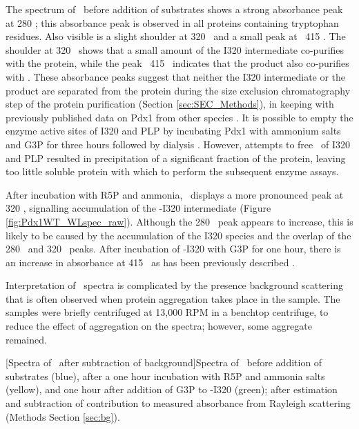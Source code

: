 The spectrum of \atpdx ~before addition of substrates shows a strong absorbance peak at 280 \nm ; this absorbance peak is observed in all proteins containing tryptophan residues. Also visible is a slight shoulder at 320 \nm ~and a small peak at ~415 \nm . The shoulder at 320 \nm ~shows that a small amount of the I320 intermediate co-purifies with the protein, while the peak ~415 \nm ~indicates that the product also co-purifies with \atpdx . These absorbance peaks suggest that neither the I320 intermediate or the product are separated from the protein during the size exclusion chromatography step of the protein purification (Section \ref{sec:SEC_Methods}), in keeping with previously published data on Pdx1 from other species \cite{Raschle2007}. It is possible to empty the enzyme active sites of I320 and PLP by incubating Pdx1 with ammonium salts and G3P for three hours followed by dialysis \cite{Raschle2007}. However, attempts to free \atpdx ~of I320 and PLP resulted in precipitation of a significant fraction of the protein, leaving too little soluble protein with which to perform the subsequent enzyme assays.   %

After incubation with R5P and ammonia, \atpdx ~displays a more pronounced peak at 320 \nm , signalling accumulation of the \atpdx -I320 intermediate (Figure \ref{fig:Pdx1WT_WLspec_raw}). Although the 280 \nm ~peak appears to increase, this is likely to be caused by the accumulation of the I320 species and the overlap of the 280 \nm ~and 320 \nm ~peaks. After incubation of \atpdx -I320 with G3P for one hour, there is an increase in absorbance at 415 \nm ~as has been previously described \cite{Raschle2006}. 

Interpretation of \atpdx ~spectra is complicated by the presence background scattering that is often observed when protein aggregation takes place in the sample. The samples were briefly centrifuged at 13,000 RPM in a benchtop centrifuge, to reduce the effect of aggregation on the spectra; however, some aggregate remained.  

\begin{minipage}{\linewidth}

	[Spectra of \atpdx ~after subtraction of background]{Spectra of \atpdx ~before addition of substrates (blue), after a one hour incubation with R5P and ammonia salts (yellow), and one hour after addition of G3P to \atpdx -I320 (green); after estimation and subtraction of contribution to measured absorbance from Rayleigh scattering (Methods Section \ref{sec:bg}).\label{fig:Pdx1WT_RayleighSub}}	
\end{minipage}

